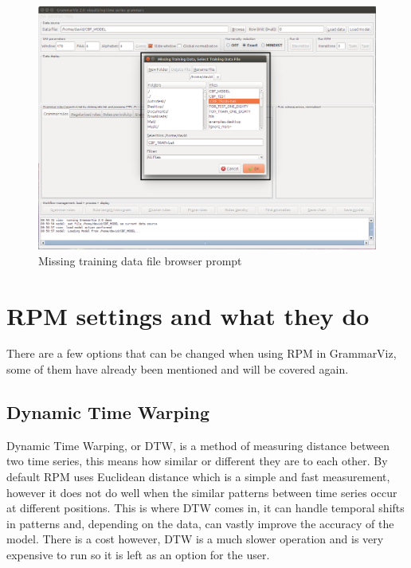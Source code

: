 \documentclass[letterpaper, 12pt]{article}
\begin{document}
\begin{figure}[H]
  \includegraphics[width=\textwidth]{grammarviz-load-model-failed-data}
  \caption{Missing training data file browser prompt}
  \label{fig:grammarviz-load-model-failed-data}
\end{figure}

\newpage
\section{RPM settings and what they do}
There are a few options that can be changed when using RPM in GrammarViz, some of them have already been mentioned and will be covered again.

\subsection{Dynamic Time Warping}
Dynamic Time Warping, or DTW, is a method of measuring distance between two time series, this means how similar or different they are to each other. By default RPM uses Euclidean distance which is a simple and fast measurement, however it does not do well when the similar patterns between time series occur at different positions. This is where DTW comes in, it can handle temporal shifts in patterns and, depending on the data, can vastly improve the accuracy of the model. There is a cost however, DTW is a much slower operation and is very expensive to run so it is left as an option for the user. 
\end{document}
